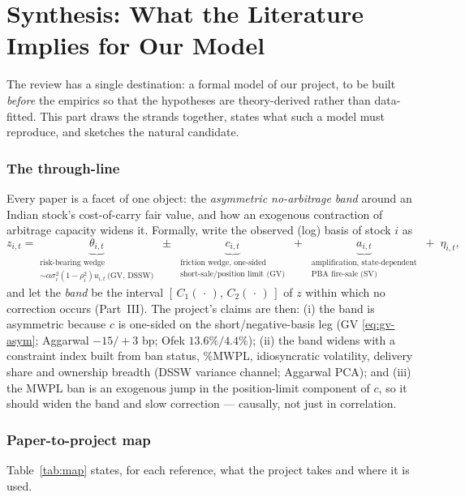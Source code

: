 \part{Synthesis: What the Literature Implies for Our Model}
\label{part:synthesis}

The review has a single destination: a formal model of our project, to be built \emph{before} the empirics so that the hypotheses are theory-derived rather than data-fitted. This part draws the strands together, states what such a model must reproduce, and sketches the natural candidate.

\section{The through-line}
Every paper is a facet of one object: the \emph{asymmetric no-arbitrage band} around an Indian stock's cost-of-carry fair value, and how an exogenous contraction of arbitrage capacity widens it. Formally, write the observed (log) basis of stock $i$ as
\begin{equation}
z_{i,t} = \underbrace{\theta_{i,t}}_{\substack{\text{risk-bearing wedge}\\ \sim \alpha\sigma_i^2(1-\rho_i^2)u_{i,t}\ \text{(GV, DSSW)}}} \;\pm\; \underbrace{c_{i,t}}_{\substack{\text{friction wedge, one-sided}\\ \text{short-sale/position limit (GV)}}} \;+\; \underbrace{a_{i,t}}_{\substack{\text{amplification, state-dependent}\\ \text{PBA fire-sale (SV)}}} \;+\; \eta_{i,t},
\end{equation}
and let the \emph{band} be the interval $[\,C_1(\,\cdot\,),\,C_2(\,\cdot\,)\,]$ of $z$ within which no correction occurs (Part~III). The project's claims are then: (i) the band is asymmetric because $c$ is one-sided on the short/negative-basis leg (GV \eqref{eq:gv-asym}; Aggarwal $-15/+3$ bp; Ofek $13.6\%/4.4\%$); (ii) the band widens with a constraint index built from ban status, \%MWPL, idiosyncratic volatility, delivery share and ownership breadth (DSSW variance channel; Aggarwal PCA); and (iii) the MWPL ban is an exogenous jump in the position-limit component of $c$, so it should widen the band and slow correction --- causally, not just in correlation.

\section{Paper-to-project map}
Table~\ref{tab:map} states, for each reference, what the project takes and where it is used.

